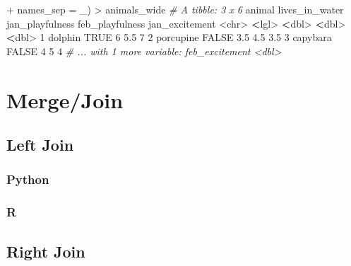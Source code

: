 \documentclass[
]{book}
\newenvironment{Shaded}{\begin{snugshade}}{\end{snugshade}}
\newcommand{\AttributeTok}[1]{\textcolor[rgb]{0.77,0.63,0.00}{#1}}
\newcommand{\CommentTok}[1]{\textcolor[rgb]{0.56,0.35,0.01}{\textit{#1}}}
\newcommand{\ConstantTok}[1]{\textcolor[rgb]{0.00,0.00,0.00}{#1}}
\newcommand{\DecValTok}[1]{\textcolor[rgb]{0.00,0.00,0.81}{#1}}
\newcommand{\ErrorTok}[1]{\textcolor[rgb]{0.64,0.00,0.00}{\textbf{#1}}}
\newcommand{\FloatTok}[1]{\textcolor[rgb]{0.00,0.00,0.81}{#1}}
\newcommand{\NormalTok}[1]{#1}
\newcommand{\SpecialCharTok}[1]{\textcolor[rgb]{0.00,0.00,0.00}{#1}}
\newcommand{\StringTok}[1]{\textcolor[rgb]{0.31,0.60,0.02}{#1}}
\begin{document}
\begin{Shaded}
\begin{Highlighting}[]
\SpecialCharTok{+}                             \AttributeTok{names\_sep =} \StringTok{\textquotesingle{}\_\textquotesingle{}}\NormalTok{)}
\SpecialCharTok{\textgreater{}}\NormalTok{ animals\_wide}
\CommentTok{\# A tibble: 3 x 6}
\NormalTok{  animal    lives\_in\_water jan\_playfulness feb\_playfulness jan\_excitement}
  \SpecialCharTok{\textless{}}\NormalTok{chr}\SpecialCharTok{\textgreater{}}     \ErrorTok{\textless{}}\NormalTok{lgl}\SpecialCharTok{\textgreater{}}                    \ErrorTok{\textless{}}\NormalTok{dbl}\SpecialCharTok{\textgreater{}}           \ErrorTok{\textless{}}\NormalTok{dbl}\SpecialCharTok{\textgreater{}}          \ErrorTok{\textless{}}\NormalTok{dbl}\SpecialCharTok{\textgreater{}}
\DecValTok{1}\NormalTok{ dolphin   }\ConstantTok{TRUE}                       \DecValTok{6}               \FloatTok{5.5}            \DecValTok{7}  
\DecValTok{2}\NormalTok{ porcupine }\ConstantTok{FALSE}                      \FloatTok{3.5}             \FloatTok{4.5}            \FloatTok{3.5}
\DecValTok{3}\NormalTok{ capybara  }\ConstantTok{FALSE}                      \DecValTok{4}               \DecValTok{5}              \DecValTok{4}  
\CommentTok{\# ... with 1 more variable: feb\_excitement \textless{}dbl\textgreater{}}
\end{Highlighting}
\end{Shaded}

\hypertarget{mergejoin}{%
\section{Merge/Join}\label{mergejoin}}

\hypertarget{left-join}{%
\subsection{Left Join}\label{left-join}}

\hypertarget{python-27}{%
\subsubsection*{Python}\label{python-27}}

\hypertarget{r-27}{%
\subsubsection*{R}\label{r-27}}

\hypertarget{right-join}{%
\subsection{Right Join}\label{right-join}}
\end{document}
